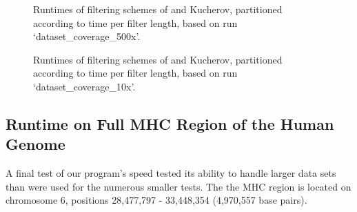 \begin{figure}[!htb]
\centering
{}
\caption{Runtimes of filtering schemes of \vali{} and Kucherov, partitioned according to time per filter length, based on run `dataset\_coverage\_500x'.}
\label{fig:schemes500}
\end{figure}

\begin{figure}[!htb]
\centering
{}
\caption{Runtimes of filtering schemes of \vali{} and Kucherov, partitioned according to time per filter length, based on run `dataset\_coverage\_10x'.}
\label{fig:schemes10}
\end{figure}


\FloatBarrier
\subsection{Runtime on Full MHC Region of the Human Genome}
\label{fullmhc}

A final test of our program's speed tested its ability to handle larger data sets than were used for the numerous smaller tests. The the MHC region is located on chromosome 6, positions 28,477,797 - 33,448,354 (4,970,557 base pairs).

